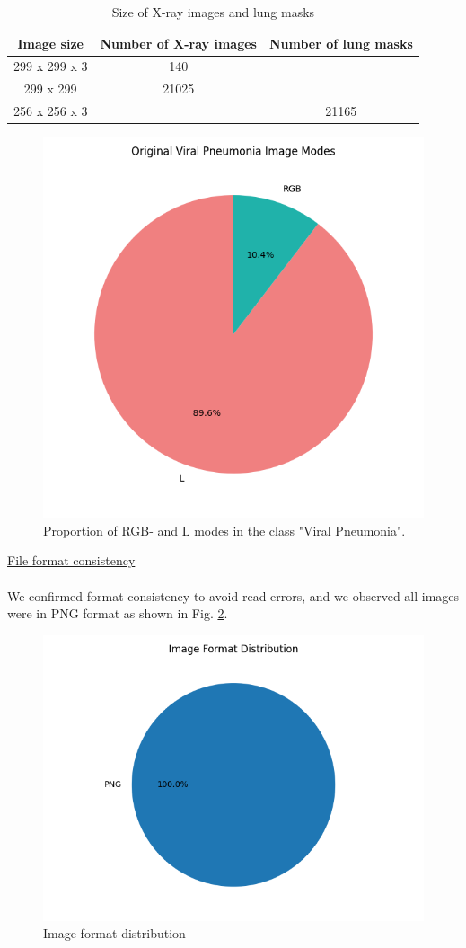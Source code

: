 \documentclass{article}
\begin{document}
\begin{table}[h]
    \centering
    \begin{tabular}{|c|c|c|}
        \hline
        \textbf{Image size} & \textbf{Number of X-ray images} & \textbf{Number of lung masks} \\ \hline
        299 x 299 x 3 & 140 &  \\ \hline
        299 x 299 & 21025 &  \\ \hline \hline
        256 x 256 x 3 &  & 21165 \\ \hline
    \end{tabular}
    \caption{Size of X-ray images and lung masks}
    \label{tab:iamges_sizes}
\end{table}

\begin{figure}[h!] %
    \centering
    \includegraphics[width=0.5\linewidth]{rgb vs L.png}
    \caption{Proportion of RGB- and L modes in the class "Viral Pneumonia".}
    \label{fig:modes_viral_pneumonia}
\end{figure}

\vspace{0.3cm}\newpage
              
\noindent \underline{File format consistency} \\
\\
We confirmed format consistency to avoid read errors, and we observed all images were in PNG format as shown in Fig. \ref{fig:image-format}.

\vspace{0.3cm}

\begin{figure}[h!]%
    \centering
    \includegraphics[width=0.7\linewidth]{image_format_distribution.png}
    \caption{Image format distribution}
    \label{fig:image-format}
\end{figure}   
\end{document}
